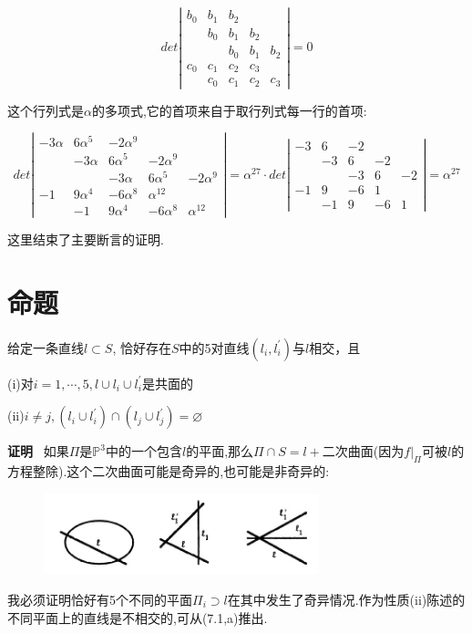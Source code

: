 \documentclass[UTF8]{book}
\begin{document}
	\[
	det\left|\begin{array}{cccccc}
	b_{0} &  b_{1} & b_{2}&  & \\
	  & b_{0} &  b_{1} & b_{2}&  \\
	  &   &b_{0} &  b_{1} & b_{2}\\
	c_{0} &  c_{1} & c_{2}& c_{3} & \\
	  &  c_{0} &  c_{1} & c_{2}& c_{3}
	\end{array}\right|=0
	\]
	
	这个行列式是$\alpha$的多项式,它的首项来自于取行列式每一行的首项:
	
	\[
	det\left|\begin{array}{cccccc}
	-3\alpha &  6\alpha^{5} & -2\alpha^{9}&  & \\
	  &-3\alpha &  6\alpha^{5} & -2\alpha^{9}&  \\
	  &   &-3\alpha &  6\alpha^{5} & -2\alpha^{9}\\
	-1& 9\alpha^{4} &  -6\alpha^{8} & \alpha^{12}& \\
	  &  -1& 9\alpha^{4} &  -6\alpha^{8} & \alpha^{12}
	\end{array}\right|=\alpha^{27}\cdot det
	\left|\begin{array}{cccccc}
	-3&  6 & -2&  & \\
	  &-3 &  6 & -2&  \\
	  &   &-3&  6 & -2\\
	-1& 9 &  -6& 1& \\
	  &  -1& 9 &  -6& 1
	\end{array}\right|=\alpha^{27}
	\]
	
	这里结束了主要断言的证明.
	\section{命题}
	
	给定一条直线$l\subset S$, 恰好存在$ S $中的5对直线$(l_{i},l^{'}_{i})$与$l$相交，且
	
	(i)对$i=1,\cdots ,5, l\cup l_{i} \cup l^{'}_{i}$是共面的
	
	(ii)$i\neq j, (l_{i} \cup l^{'}_{i})\cap(l_{j} \cup l^{'}_{j})= \varnothing $
	
	\textbf{证明} \ 如果$\Pi$是$\mathbb{P}^{3}$中的一个包含$l$的平面,那么$\Pi\cap S=l+\text{二次曲面}$(因为$f|_{\Pi}$可被$l$的方程整除).这个二次曲面可能是奇异的,也可能是非奇异的:
	\begin{figure}[H]
		\centering
		\includegraphics[width=8cm]{106.jpg}
	\end{figure}
	我必须证明恰好有5个不同的平面$\Pi_{i} \supset l $在其中发生了奇异情况.作为性质(ii)陈述的不同平面上的直线是不相交的,可从(7.1,a)推出.
	
\end{document}
